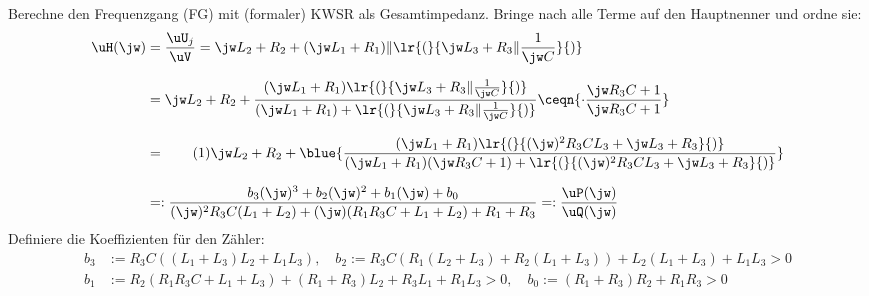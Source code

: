 %
\newcommand{\defaultPath}{/docs/LaTeX_Def/}




%

\allowdisplaybreaks
\reversemarginpar
\newcommand{\numberthis}[1]{%
	\stepcounter{equation}\tag{\theequation}\label{#1}%
}%

%
%
%
\noindent Berechne den Frequenzgang (FG) mit (formaler) KWSR als Gesamtimpedanz. Bringe nach  alle Terme auf den Hauptnenner und ordne sie:
\begin{align*}%
	\uH(\jw)&=\frac{\uU_j}{\uV}=\jw L_2+R_2+(\jw L_1+R_1)\|\lr{(}{%
		\jw L_3+R_3\|\frac{1}{\jw C}%
	}{)}\\[2.5mm]%
%
	&=\jw L_2+R_2+\frac{%
		(\jw L_1+R_1)\lr{(}{%
			\jw L_3+R_3\|\frac{1}{\jw C}%
		}{)}
	}{%
		(\jw L_1+R_1)+\lr{(}{%
			\jw L_3+R_3\|\frac{1}{\jw C}%
		}{)}%
	}\ceqn{%
		\cdot\frac{\jw R_3C+1}{\jw R_3C+1}%
	}\\[2.5mm]%
%
	&=\numberthis{a1a_FG_Poly1}\jw L_2+R_2+\blue{\frac{%
		(\jw L_1+R_1)\lr{(}{%
			(\jw)^2R_3CL_3+\jw L_3+R_3%
		}{)}%
	}{%
		(\jw L_1+R_1)(\jw R_3C+1)+\lr{(}{%
			(\jw)^2R_3CL_3+\jw L_3+R_3%
		}{)}%
	}}\\[2.5mm]%
%
	&=:\frac{%
		b_3(\jw)^3+b_2(\jw)^2+b_1(\jw)+b_0%
	}{%
		(\jw)^2R_3C(L_1+L_2)+(\jw)(R_1R_3C+L_1+L_2)+R_1+R_3%
	}=:\frac{\uP(\jw)}{\uQ(\jw)}%
\end{align*}
%
Definiere die Koeffizienten für den Zähler:
\begin{align*}
	b_3&:=R_3C((L_1+L_3)L_2+L_1L_3),\quad b_2:=R_3C(R_1(L_2+L_3)+R_2(L_1+L_3))+L_2(L_1+L_3)+L_1L_3>0\\[2.5mm]%
%
	b_1&:=R_2(R_1R_3C+L_1+L_3)+(R_1+R_3)L_2+R_3L_1+R_1L_3>0,\quad b_0:=(R_1+R_3)R_2+R_1R_3>0%
\end{align*}%
%


